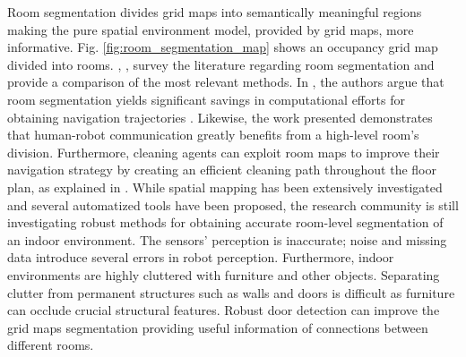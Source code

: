  Room segmentation divides grid maps into semantically meaningful regions making the pure spatial environment model, provided by grid maps, more informative. Fig. \ref{fig:room_segmentation_map} shows an occupancy grid map divided into rooms. \citeauthor{segmentationsurvey}, \cite{segmentationsurvey}, survey the literature regarding room segmentation and provide a comparison of the most relevant methods. In \cite{segmenationfornavigation}, the authors argue that room segmentation yields significant savings in computational efforts for obtaining navigation trajectories . Likewise, the work presented \cite{segmentationhumanrobot} demonstrates that human-robot communication greatly benefits from a high-level room's division. Furthermore, cleaning agents can exploit room maps to improve their navigation strategy by creating an efficient cleaning path throughout the floor plan, as explained in \cite{segmentationcleaning}. While spatial mapping has been extensively investigated and several automatized tools have been proposed, the research community is still investigating robust methods for obtaining accurate room-level segmentation of an indoor environment. The sensors' perception is inaccurate; noise and missing data introduce several errors in robot perception. Furthermore, indoor environments are highly cluttered with furniture and other objects. Separating clutter from permanent structures such as walls and doors is difficult as furniture can occlude crucial structural features. Robust door detection can improve the grid maps segmentation providing useful information of connections between different rooms.
 
